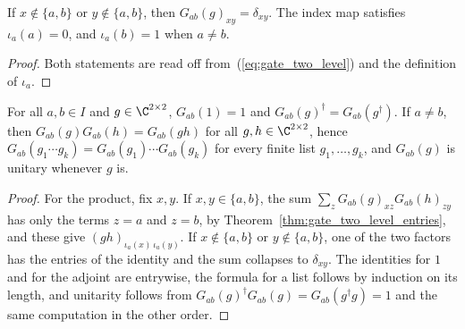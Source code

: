 \begin{theorem}
    \label{thm:gate_two_level_entries}
    \leanok
    If $x\notin\{a,b\}$ or $y\notin\{a,b\}$, then
    $G_{ab}(g)_{xy}=\delta_{xy}$. The index map satisfies
    $\iota_a(a)=0$, and $\iota_a(b)=1$ when $a\neq b$.
\end{theorem}
\begin{proof}\leanok
    Both statements are read off from~(\ref{eq:gate_two_level}) and the
    definition of $\iota_a$.
\end{proof}

\begin{theorem}
    \label{thm:gate_two_level_algebra}
    \leanok
    For all $a,b\in I$ and $g\in\C^{2\times2}$,
    $G_{ab}(1)=1$ and $G_{ab}(g)^\dagger=G_{ab}(g^\dagger)$. If $a\neq b$,
    then $G_{ab}(g)G_{ab}(h)=G_{ab}(gh)$ for all $g,h\in\C^{2\times2}$, hence
    $G_{ab}(g_1\cdots g_k)=G_{ab}(g_1)\cdots G_{ab}(g_k)$ for every finite
    list $g_1,\ldots,g_k$, and $G_{ab}(g)$ is unitary whenever $g$ is.
\end{theorem}
\begin{proof}\leanok
    For the product, fix $x,y$. If $x,y\in\{a,b\}$, the sum
    $\sum_zG_{ab}(g)_{xz}G_{ab}(h)_{zy}$ has only the terms $z=a$ and $z=b$,
    by Theorem~\ref{thm:gate_two_level_entries}, and these give
    $(gh)_{\iota_a(x)\,\iota_a(y)}$. If $x\notin\{a,b\}$ or
    $y\notin\{a,b\}$, one of the two factors has the entries of the identity
    and the sum collapses to $\delta_{xy}$. The identities for $1$ and for
    the adjoint are entrywise, the formula for a list follows by induction on
    its length, and unitarity follows from
    $G_{ab}(g)^\dagger G_{ab}(g)=G_{ab}(g^\dagger g)=1$ and the same
    computation in the other order.
\end{proof}

